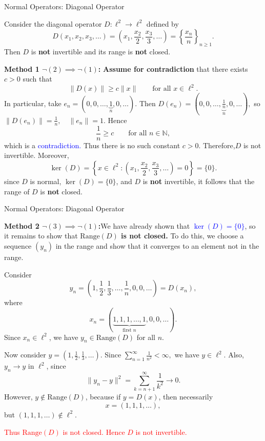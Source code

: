 \documentclass[9pt, aspectratio=169]{beamer}
\begin{document}
\begin{frame}{Normal Operators: Diagonal Operator}
\begin{example}
Consider the diagonal operator $D:\ell^2\to\ell^2$ defined by
\[
D(x_1,x_2,x_3,\dots)=\left(x_1,\frac{x_2}{2},\frac{x_3}{3},\dots\right)=\left\{\frac{x_n}{n}\right\}_{n\ge1}.
\]
Then $D$ is \textbf{not} invertible and its range is \textbf{not} closed.
\end{example}

{\fontsize{8.5pt}{4pt}\selectfont 
\textbf{Method 1 \(\neg(2)\implies \neg(1)\):} \pause  \textbf{Assume for contradiction} that there exists $c>0$ such that
\[
\|D(x)\|\ge c\|x\| \qquad \text{for all } x\in \ell^2.
\]
In particular, take
$
e_n=(0,0,\dots,\underbrace{1}_{n},0,\dots).
$
Then
$
D(e_n)=\left(0,0,\dots,\underbrace{\frac{1}{n}}_{n},0,\dots\right),
$
so
$
\|D(e_n)\|=\frac{1}{n}, \quad \|e_n\|=1.
$
Hence
\[
\frac{1}{n}\ge c \qquad \text{for all } n\in\mathbb N,
\]
which is a \textcolor{blue}{contradiction.} Thus there is no such constant $c>0$.
 Therefore,$D$ is not invertible.
Moreover,
\[
\ker(D)=\left\{x\in\ell^2:\left(x_1,\frac{x_2}{2},\frac{x_3}{3},\dots\right)=0\right\}=\{0\}.
\]
    since $D$ is normal, $\ker(D)=\{0\}$, and $D$ is \textbf{not} invertible, it follows that the range of $D$ is \textbf{not} closed.}
\end{frame}
\begin{frame}{Normal Operators: Diagonal Operator}

{\fontsize{8.5pt}{4pt}\selectfont
\textbf{Method 2 \(\neg(3)\implies \neg(1)\):}\pause  We have already shown that \textcolor{blue}{$\ker(D)=\{0\}$}, so it remains to show that \textbf{$\mathrm{Range}(D)$ is not closed.} To do this, we choose a sequence $(y_n)$ in the range and show that it converges to an element not in the range.

Consider
\[
y_n=\left(1,\frac{1}{2},\frac{1}{3},\dots,\frac{1}{n},0,0,\dots\right)=D(x_n),
\]
where
\[
x_n=(\underbrace{1,1,1,\dots,1}_{\text{first } n},0,0,\dots).
\]
Since $x_n\in \ell^2$, we have $y_n\in \mathrm{Range}(D)$ for all $n$.

Now consider
$
y=\left(1,\frac{1}{2},\frac{1}{3},\dots\right).
$
Since
$
\sum_{n=1}^{\infty}\frac{1}{n^2}<\infty,
$
we have $y\in \ell^2$. Also, $y_n\to y$ in $\ell^2$, since
\[
\|y_n-y\|^2=\sum_{k=n+1}^{\infty}\frac{1}{k^2}\to 0.
\]
However, $y\notin \mathrm{Range}(D)$, because if $y=D(x)$, then necessarily
\[
x=(1,1,1,\dots),
\]
but $(1,1,1,\dots)\notin \ell^2$.

\textcolor{red}{Thus $\mathrm{Range}(D)$ is not closed. Hence $D$ is not invertible.}
}  
\end{frame}
\end{document}
